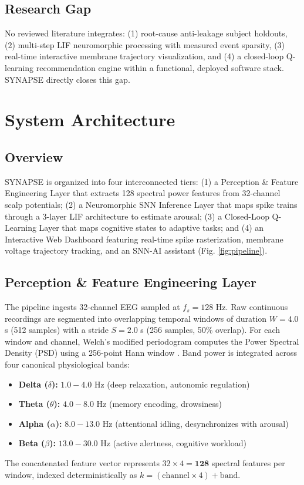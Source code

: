 \documentclass[conference]{IEEEtran}
\begin{document}
\subsection{Research Gap}
No reviewed literature integrates: (1) root-cause anti-leakage subject holdouts, (2) multi-step LIF neuromorphic processing with measured event sparsity, (3) real-time interactive membrane trajectory visualization, and (4) a closed-loop Q-learning recommendation engine within a functional, deployed software stack. SYNAPSE directly closes this gap.

\section{System Architecture}

\subsection{Overview}
SYNAPSE is organized into four interconnected tiers: (1) a Perception \& Feature Engineering Layer that extracts 128 spectral power features from 32-channel scalp potentials; (2) a Neuromorphic SNN Inference Layer that maps spike trains through a 3-layer LIF architecture to estimate arousal; (3) a Closed-Loop Q-Learning Layer that maps cognitive states to adaptive tasks; and (4) an Interactive Web Dashboard featuring real-time spike rasterization, membrane voltage trajectory tracking, and an SNN-AI assistant (Fig. \ref{fig:pipeline}).

\subsection{Perception \& Feature Engineering Layer}
The pipeline ingests 32-channel EEG sampled at $f_s = 128$ Hz. Raw continuous recordings are segmented into overlapping temporal windows of duration $W = 4.0$ s (512 samples) with a stride $S = 2.0$ s (256 samples, 50\% overlap). For each window and channel, Welch's modified periodogram computes the Power Spectral Density (PSD) using a 256-point Hann window \cite{r14}. Band power is integrated across four canonical physiological bands:
\begin{itemize}
    \item \textbf{Delta ($\delta$):} $1.0 - 4.0$ Hz (deep relaxation, autonomic regulation)
    \item \textbf{Theta ($\theta$):} $4.0 - 8.0$ Hz (memory encoding, drowsiness)
    \item \textbf{Alpha ($\alpha$):} $8.0 - 13.0$ Hz (attentional idling, desynchronizes with arousal)
    \item \textbf{Beta ($\beta$):} $13.0 - 30.0$ Hz (active alertness, cognitive workload)
\end{itemize}
The concatenated feature vector represents $32 \times 4 = \mathbf{128}$ spectral features per window, indexed deterministically as $k = (\text{channel} \times 4) + \text{band}$.
\end{document}
